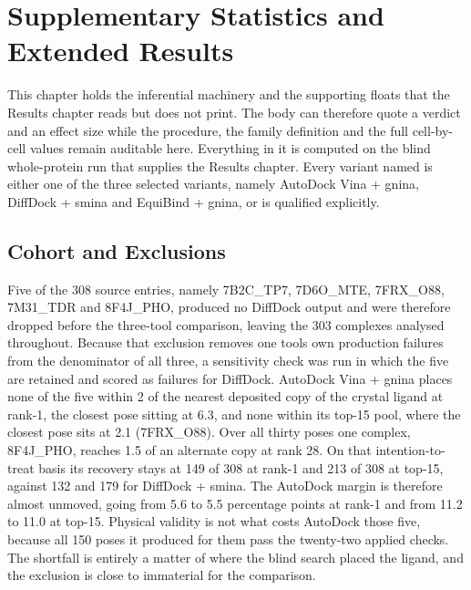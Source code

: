 \hypertarget{supplementary-statistics}{%
\chapter{Supplementary Statistics and Extended Results}\label{supplementary-statistics}}

This chapter holds the inferential machinery and the supporting floats that the Results chapter reads but does not print. The body can therefore quote a verdict and an effect size while the procedure, the family definition and the full cell-by-cell values remain auditable here. Everything in it is computed on the blind whole-protein run that supplies the Results chapter. Every variant named is either one of the three selected variants, namely AutoDock Vina + gnina, DiffDock + smina and EquiBind + gnina, or is qualified explicitly.

\hypertarget{cohort-and-exclusions}{%
\section{Cohort and Exclusions}\label{cohort-and-exclusions}}

Five of the 308 source entries, namely 7B2C\_TP7, 7D6O\_MTE, 7FRX\_O88, 7M31\_TDR and 8F4J\_PHO, produced no DiffDock output and were therefore dropped before the three-tool comparison, leaving the 303 complexes analysed throughout. Because that exclusion removes one tool\textquotesingle s own production failures from the denominator of all three, a sensitivity check was run in which the five are retained and scored as failures for DiffDock. AutoDock Vina + gnina places none of the five within 2\angstrom{} of the nearest deposited copy of the crystal ligand at rank-1, the closest pose sitting at 6.3\angstrom{}, and none within its top-15 pool, where the closest pose sits at 2.1\angstrom{} (7FRX\_O88). Over all thirty poses one complex, 8F4J\_PHO, reaches 1.5\angstrom{} of an alternate copy at rank 28. On that intention-to-treat basis its recovery stays at 149 of 308 at rank-1 and 213 of 308 at top-15, against 132 and 179 for DiffDock + smina. The AutoDock margin is therefore almost unmoved, going from 5.6 to 5.5 percentage points at rank-1 and from 11.2 to 11.0 at top-15. Physical validity is not what costs AutoDock those five, because all 150 poses it produced for them pass the twenty-two applied checks. The shortfall is entirely a matter of where the blind search placed the ligand, and the exclusion is close to immaterial for the comparison.

